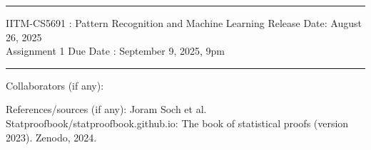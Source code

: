 \documentclass[solution,addpoints,12pt]{exam}
\begin{document}
\hrule
\vspace{3mm}
\noindent 
{\sf IITM-CS5691 : Pattern Recognition and Machine Learning  \hfill Release Date: August 26, 2025}
\\
\noindent 
{\sf Assignment 1 \hfill Due Date : September 9, 2025, 9pm}
\vspace{3mm}
\hrule
\vspace{3mm}

\noindent
{{\sf Collaborators (if any): }} %

\noindent
{{\sf References/sources (if any): Joram Soch et al. Statproofbook/statproofbook.github.io: The book of statistical proofs (version 2023).
		Zenodo, 2024.
}} %
\end{document}
